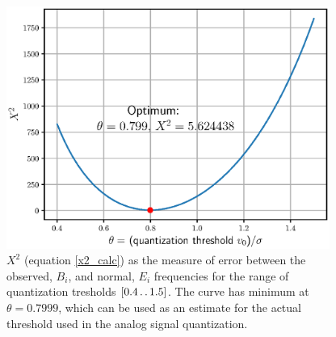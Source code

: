\documentclass[letterpaper,twoside,12pt]{article}
\begin{document}
\begin{figure}[ht!]
  \begin{center}
  \includegraphics[width=25pc]{fig_optimal_quantization_threshold.eps}
  \caption{\small $X^2$ (equation \eqref{x2_calc}) as the measure of error between the observed, $B_i$, and normal, $E_i$ frequencies for the range of quantization tresholds $[0.4 \mathinner{\ldotp\ldotp}1.5]$. The curve has minimum at $\theta = 0.7999$, which can be used as an estimate for the actual threshold used in the analog signal quantization.}
  \label{optimum_theta}
  \end{center}
\end{figure}
\end{document}
